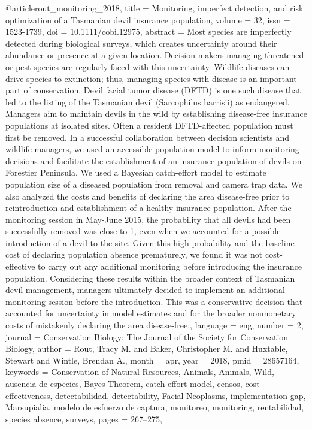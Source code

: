 {{{{@article{rout_monitoring_2018,
	title = {Monitoring, imperfect detection, and risk optimization of a {Tasmanian} devil insurance population},
	volume = {32},
	issn = {1523-1739},
	doi = {10.1111/cobi.12975},
	abstract = {Most species are imperfectly detected during biological surveys, which creates uncertainty around their abundance or presence at a given location. Decision makers managing threatened or pest species are regularly faced with this uncertainty. Wildlife diseases can drive species to extinction; thus, managing species with disease is an important part of conservation. Devil facial tumor disease (DFTD) is one such disease that led to the listing of the Tasmanian devil (Sarcophilus harrisii) as endangered. Managers aim to maintain devils in the wild by establishing disease-free insurance populations at isolated sites. Often a resident DFTD-affected population must first be removed. In a successful collaboration between decision scientists and wildlife managers, we used an accessible population model to inform monitoring decisions and facilitate the establishment of an insurance population of devils on Forestier Peninsula. We used a Bayesian catch-effort model to estimate population size of a diseased population from removal and camera trap data. We also analyzed the costs and benefits of declaring the area disease-free prior to reintroduction and establishment of a healthy insurance population. After the monitoring session in May-June 2015, the probability that all devils had been successfully removed was close to 1, even when we accounted for a possible introduction of a devil to the site. Given this high probability and the baseline cost of declaring population absence prematurely, we found it was not cost-effective to carry out any additional monitoring before introducing the insurance population. Considering these results within the broader context of Tasmanian devil management, managers ultimately decided to implement an additional monitoring session before the introduction. This was a conservative decision that accounted for uncertainty in model estimates and for the broader nonmonetary costs of mistakenly declaring the area disease-free.},
	language = {eng},
	number = {2},
	journal = {Conservation Biology: The Journal of the Society for Conservation Biology},
	author = {Rout, Tracy M. and Baker, Christopher M. and Huxtable, Stewart and Wintle, Brendan A.},
	month = apr,
	year = {2018},
	pmid = {28657164},
	keywords = {Conservation of Natural Resources, Animals, Animals, Wild, ausencia de especies, Bayes Theorem, catch-effort model, censos, cost-effectiveness, detectabilidad, detectability, Facial Neoplasms, implementation gap, Marsupialia, modelo de esfuerzo de captura, monitoreo, monitoring, rentabilidad, species absence, surveys},
	pages = {267--275},
}

}}}}

